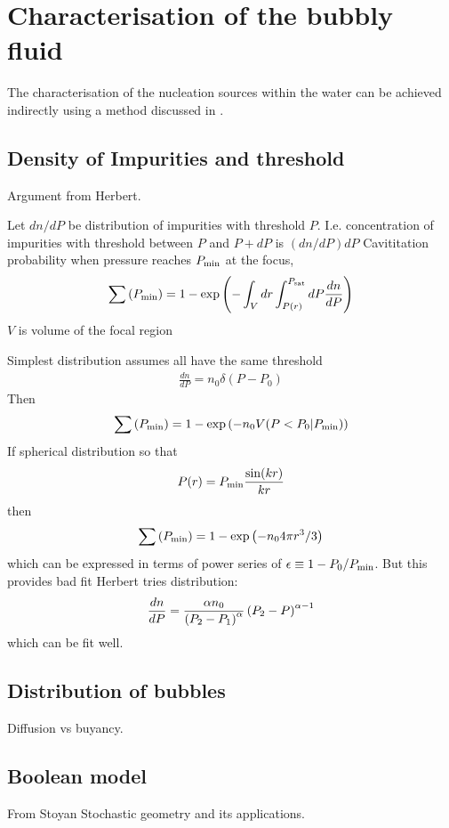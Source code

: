 \section{Characterisation of the bubbly fluid}
  
The characterisation of the nucleation sources within the water can be achieved indirectly
using a method discussed in .  

\subsection{Density of Impurities and threshold}
Argument from Herbert\cite{Herbert2006}.

Let $dn/dP$ be distribution of impurities with threshold $P$.
I.e. concentration of impurities with threshold between $P$ and $P+dP$ is $(dn/dP)dP$
Cavititation probability when pressure reaches ${P_{\textrm{min}}}$ at the focus,
\begin{align}
  \sum\left( {P_{\textrm{min}}} \right) = 1- \exp\left( -\int_Vdr \int_{P(r)}^{P_{\textrm{sat}}} dP \frac{dn}{dP}  \right)
\end{align}
$V$ is volume of the focal region

Simplest distribution assumes all have the same threshold 
\begin{align}
  \frac{dn}{dP} = n_0 \delta(P-P_0)
\end{align}
Then 
\begin{align}
  \sum\left( {P_{\textrm{min}}} \right) = 1- \exp\left( -n_0 V(P<P_0|{P_{\textrm{min}}}) \right)
\end{align}
If spherical distribution so that 
\begin{align}
  P(r) = {P_{\textrm{min}}} \frac{\sin(kr)}{kr}
\end{align}
then
\begin{align}
  \sum\left( {P_{\textrm{min}}} \right) = 1- \exp\left( -n_0 4\pi r^3 /3 \right)
\end{align}
which can be expressed in terms of power series of $\epsilon \equiv 1-P_0/{P_{\textrm{min}}}$.
But this provides bad fit
Herbert tries distribution:
\begin{align}
\frac{dn}{dP} = \frac{\alpha n_0}{\left( P_2-P_1 \right)^{\alpha}}\left( P_2-P \right)^{\alpha-1}
\end{align}
which can be fit well.

\subsection{Distribution of bubbles}

Diffusion vs buyancy.

\subsection{Boolean model}
From Stoyan Stochastic geometry and its applications.

